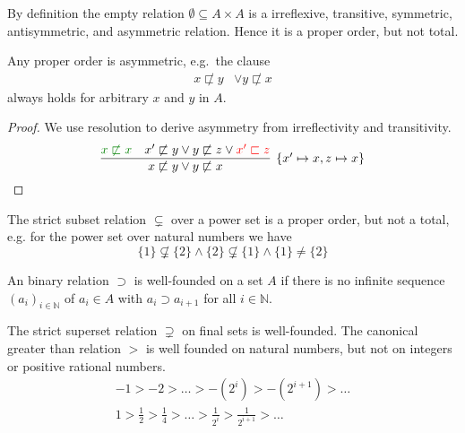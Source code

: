 \begin{example}
	By definition the empty relation $\emptyset \subseteq A \times A$ is a
	irreflexive,
	transitive,
	symmetric,
	antisymmetric,
	and asymmetric
	relation. 
	Hence it is a proper order, but not total.
\end{example}

\begin{lemma}
	Any proper order is asymmetric, e.g.~the clause
	\begin{align*}
	x\not\sqsubset y &\lor y\not\sqsubset x \tag*{asymmetry}
	\end{align*}
	always holds for arbitrary $x$ and $y$ in $A$.
\end{lemma}

\begin{proof} We use resolution to derive asymmetry from irreflectivity and transitivity.
	\[
			\infer[\{x'\mapsto x, z\mapsto x \}]{
			x\not\sqsubset y \lor y\not\sqsubset x }{
			{\colHi x\not\sqsubset x} & x'\not\sqsubset y \lor  y \not\sqsubset z \lor {\colLo x'\sqsubset z}
		}
	\]
\end{proof}

\begin{example}The strict subset relation $\subsetneq$ over a power set is a proper order, but not a total, 
	e.g. for the power set over natural numbers we have 
	\[
	\{ 1 \} \not\subsetneq \{ 2 \}
	\land \{ 2 \} \not\subsetneq \{ 1 \}
	\land 	\{ 1 \} \neq \{ 2 \}
	\tag*{non-totality}
	\]
\end{example}



\begin{definition}
	An binary relation $\supset$ is {\myem well-founded} on a set $A$ if there is no infinite sequence 
	$(a_i)_{i\in\mathbb{N}}$ of $a_i\in A$
	with $a_i\supset a_{i+1}$ for all $i\in\mathbb{N}$.
\end{definition}

\begin{example}
	The strict superset relation $\supsetneq$ on final sets is well-founded.
	The canonical greater than relation $>$ is well founded on natural numbers,
	but not on integers or positive rational numbers.
	\begin{gather*}
	-1 > -2 > \ldots > -(2^i) > -(2^{i+1}) > \ldots\\
	1 > \frac{1}{2} > \frac{1}{4} > \ldots > \frac{1}{2^i} > \frac{1}{2^{i+1}} > \ldots
	\end{gather*}
\end{example}


